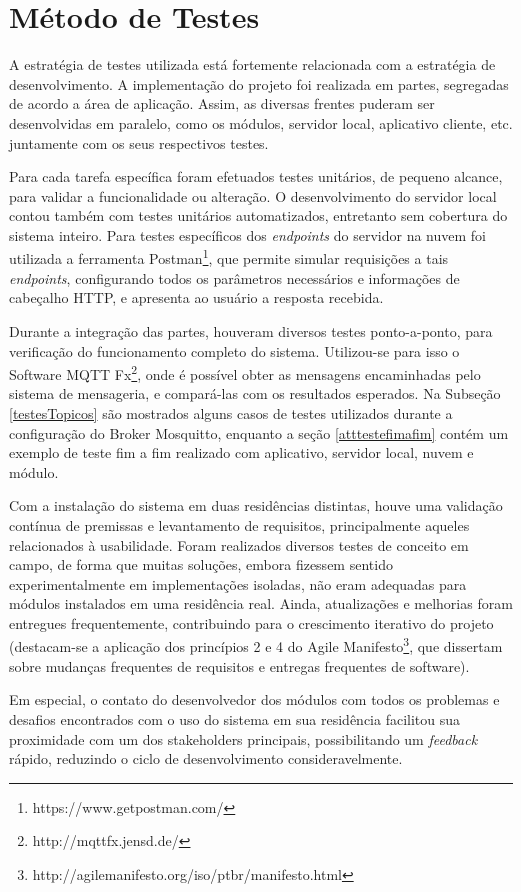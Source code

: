 \section{Método de Testes}

A estratégia de testes utilizada está fortemente relacionada com a estratégia de desenvolvimento. A implementação do projeto foi realizada em partes, segregadas de acordo a área de aplicação. Assim, as diversas frentes puderam ser desenvolvidas em paralelo, como os módulos, servidor local, aplicativo cliente, etc. juntamente com os seus respectivos testes.

Para cada tarefa específica foram efetuados testes unitários, de pequeno alcance, para validar a funcionalidade ou alteração. O desenvolvimento do servidor local contou também com testes unitários automatizados, entretanto sem cobertura do sistema inteiro. Para testes específicos dos \emph{endpoints} do servidor na nuvem foi utilizada a ferramenta Postman\footnote{https://www.getpostman.com/}, que permite simular requisições a tais \emph{endpoints}, configurando todos os parâmetros necessários e informações de cabeçalho HTTP, e apresenta ao usuário a resposta recebida.

Durante a integração das partes, houveram diversos testes ponto-a-ponto, para verificação do funcionamento completo do sistema. Utilizou-se para isso o Software MQTT Fx\footnote{http://mqttfx.jensd.de/}, onde é possível obter as mensagens encaminhadas pelo sistema de mensageria, e compará-las com os resultados esperados. Na Subseção \ref{testesTopicos} são mostrados alguns casos de testes utilizados durante a configuração do Broker Mosquitto, enquanto a seção \ref{atttestefimafim} contém um exemplo de teste fim a fim realizado com aplicativo, servidor local, nuvem e módulo.

Com a instalação do sistema em duas residências distintas, houve uma validação contínua de premissas e levantamento de requisitos, principalmente aqueles relacionados à usabilidade. Foram realizados diversos testes de conceito em campo, de forma que muitas soluções, embora fizessem sentido experimentalmente em implementações isoladas, não eram adequadas para módulos instalados em uma residência real. Ainda, atualizações e melhorias foram entregues frequentemente, contribuindo para o crescimento iterativo do projeto (destacam-se a aplicação dos princípios 2 e 4 do Agile Manifesto\footnote{http://agilemanifesto.org/iso/ptbr/manifesto.html}, que dissertam sobre mudanças frequentes de requisitos e entregas frequentes de software).

Em especial, o contato do desenvolvedor dos módulos com todos os problemas e desafios encontrados com o uso do sistema em sua residência facilitou sua proximidade com um dos stakeholders principais, possibilitando um \textit{feedback} rápido, reduzindo o ciclo de desenvolvimento consideravelmente.

